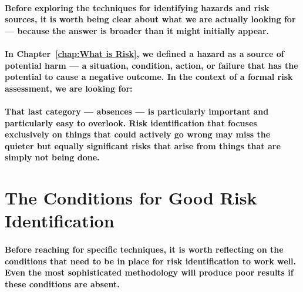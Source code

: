 \paragraph{Before exploring the techniques for identifying hazards and risk sources, it is worth being clear about what we are actually looking for — because the answer is broader than it might initially appear.}
\paragraph{In Chapter~\ref{chap:What is Risk}, we defined a hazard as a source of potential harm — a situation, condition, action, or failure that has the potential to cause a negative outcome. In the context of a formal risk assessment, we are looking for:}
\begin{itemize}
\end{itemize}
\paragraph{That last category — absences — is particularly important and particularly easy to overlook. Risk identification that focuses exclusively on things that could actively go wrong may miss the quieter but equally significant risks that arise from things that are simply not being done.}

\section{The Conditions for Good Risk Identification}
\paragraph{Before reaching for specific techniques, it is worth reflecting on the conditions that need to be in place for risk identification to work well. Even the most sophisticated methodology will produce poor results if these conditions are absent.}

